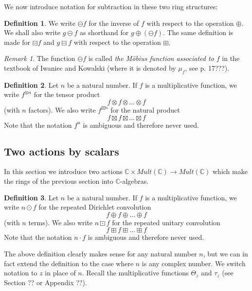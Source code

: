 \documentclass[a4paper]{article}
\theoremstyle{definition}
\newtheorem{definition}{Definition}[section]
\theoremstyle{remark}
\newtheorem*{remark}{Remark}
\begin{document}
We now introduce notation for subtraction in these two ring structures:

\begin{definition}
We write $\ominus f$ for the inverse of $f$ with respect to the operation $\oplus$. We shall also write $g \ominus f$ as shorthand for $g \oplus (\ominus f)$. The same definition is made for $\boxminus f$ and $g \boxminus f$ with respect to the operation $\boxplus$.
\end{definition}

\begin{remark}
The function $\ominus f$ is called \emph{the M{\"o}bius function associated to $f$} in the textbook of Iwaniec and Kowalski (where it is denoted by $\mu_f$, see p. 17???).
\end{remark}

\begin{definition}
Let $n$ be a natural number. If $f$ is a multiplicative function, we write $f^{\otimes n}$ for the tensor product 
$$   f \otimes f \otimes \ldots \otimes f  $$
(with $n$ factors). We also write $f^{\boxtimes n}$ for the natural product
$$   f \boxtimes f \boxtimes \ldots \boxtimes f  $$
Note that the notation $f^n$ is ambiguous and therefore never used.
\end{definition}



\subsection{Two actions by scalars}

In this section we introduce two actions $\mathbb{C} \times Mult(\mathbb{C}) \to Mult(\mathbb{C})$ which make the rings of the previous section into $\mathbb{C}$-algebras.

\begin{definition}
Let $n$ be a natural number. If $f$ is a multiplicative function, we write $n \odot f $ for the repeated Dirichlet convolution 
$$   f \oplus f \oplus \ldots \oplus f  $$
(with $n$ terms). We also write $n \boxdot f$ for the repeated unitary convolution
$$   f \boxplus f \boxplus \ldots \boxplus f  $$
Note that the notation $n \cdot f$ is ambiguous and therefore never used.
\end{definition}

The above definition clearly makes sense for any natural number $n$, but we can in fact extend the definition to the case where $n$ is any complex number. We switch notation to $z$ in place of $n$. Recall the multiplicative functions $\Theta_z$ and $\tau_z$ (see Section ?? or Appendix ??).
\end{document}
